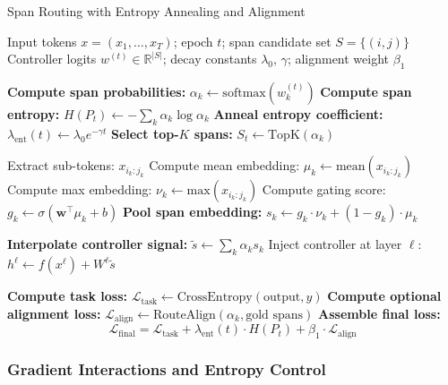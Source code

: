 \begin{algorithm}[H]
\caption{Span Routing with Entropy Annealing and Alignment}
\label{alg:span_routing}
\begin{algorithmic}[1]
\REQUIRE Input tokens $x = (x_1, \dots, x_T)$; epoch $t$; span candidate set $S = \{(i, j)\}$
\REQUIRE Controller logits $w^{(t)} \in \mathbb{R}^{|S|}$; decay constants $\lambda_0$, $\gamma$; alignment weight $\beta_1$
\vspace{0.25em}

\STATE \textbf{Compute span probabilities:} $\alpha_k \gets \mathrm{softmax}(w_k^{(t)})$
\STATE \textbf{Compute span entropy:} $H(P_t) \gets -\sum_k \alpha_k \log \alpha_k$
\STATE \textbf{Anneal entropy coefficient:} $\lambda_{\mathrm{ent}}(t) \gets \lambda_0 e^{-\gamma t}$
\STATE \textbf{Select top-$K$ spans:} $S_t \gets \text{TopK}(\alpha_k)$

  \STATE Extract sub-tokens: $x_{i_k:j_k}$
  \STATE Compute mean embedding: $\mu_k \gets \mathrm{mean}(x_{i_k:j_k})$
  \STATE Compute max embedding: $\nu_k \gets \mathrm{max}(x_{i_k:j_k})$
  \STATE Compute gating score: $g_k \gets \sigma(\mathbf{w}^\top \mu_k + b)$
  \STATE \textbf{Pool span embedding:} $s_k \gets g_k \cdot \nu_k + (1 - g_k) \cdot \mu_k$
\ENDFOR

\STATE \textbf{Interpolate controller signal:} $\tilde{s} \gets \sum_k \alpha_k s_k$
\STATE Inject controller at layer $\ell$: $h^\ell \gets f(x^\ell) + W^\ell \tilde{s}$

\STATE \textbf{Compute task loss:} $\mathcal{L}_{\text{task}} \gets \text{CrossEntropy}(\text{output}, y)$
\STATE \textbf{Compute optional alignment loss:} $\mathcal{L}_{\text{align}} \gets \text{RouteAlign}(\alpha_k, \text{gold spans})$
\STATE \textbf{Assemble final loss:}
\begin{equation}
\mathcal{L}_{\text{final}} = \mathcal{L}_{\text{task}} + \lambda_{\mathrm{ent}}(t) \cdot H(P_t) + \beta_1 \cdot \mathcal{L}_{\text{align}}
\label{eq:final_loss}
\end{equation}
\end{algorithmic}
\end{algorithm}

\subsubsection*{Gradient Interactions and Entropy Control}

